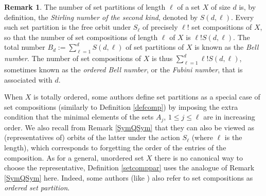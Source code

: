 \documentclass{article}
\theoremstyle{definition}
\newtheorem{rmk}[thm]{Remark}
\begin{document}
\begin{rmk}
The number of set partitions of length $\ell$ of a set $X$ of size $d$ is, by definition, the \emph{Stirling number of the second kind}, denoted by $S(d,\ell)$. Every such set partition is the free orbit under $S_{\ell}$ of precisely $\ell!$ set compositions of $X$, so that the number of set compositions of length $\ell$ of $X$ is $\ell!S(d,\ell)$. The total number $B_{d}:=\sum_{\ell=1}^{d}S(d,\ell)$ of set partitions of $X$ is known as the \emph{Bell number}. The number of set compositions of $X$ is thus $\sum_{\ell=1}^{d}\ell!S(d,\ell)$, sometimes known as the \emph{ordered Bell number}, or the \emph{Fubini number}, that is associated with $d$. \label{StirBell}
\end{rmk}
When $X$ is totally ordered, some authors define set partitions as a special case of set compositions (similarly to Definition \ref{defcomp}) by imposing the extra condition that the minimal elements of the sets $A_{j}$, $1 \leq j\leq\ell$ are in increasing order. We also recall from Remark \ref{SymQSym} that they can also be viewed as (representatives of) orbits of the latter under the action $S_{\ell}$ (where $\ell$ is the length), which corresponds to forgetting the order of the entries of the composition. As for a general, unordered set $X$ there is no canonical way to choose the representative, Definition \ref{setcomppar} uses the analogue of Remark \ref{SymQSym} here. Indeed, some authors (like \cite{[BZ]}) also refer to set compositions as \emph{ordered set partition}.

\medskip
\end{document}
